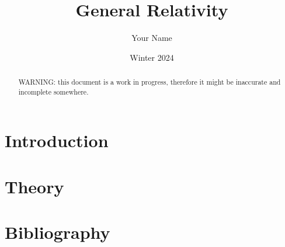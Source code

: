 \documentclass{article}
\title{General Relativity}
\author{Your Name}
\date{Winter 2024}
\begin{document}
\maketitle

\tableofcontents

\begin{abstract}
    WARNING: this document is a work in progress, therefore it might be inaccurate and incomplete somewhere.
\end{abstract}

\section{Introduction}


\section{Theory}


\section{Bibliography}
\end{document}
